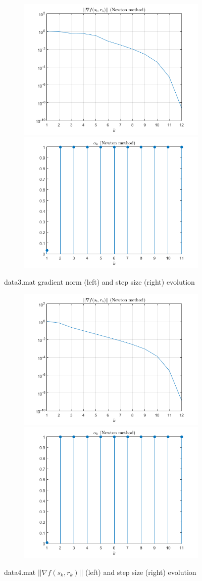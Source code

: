 \begin{figure}[H]
    \label{fig:pt2task6:data3}
    \begin{subfigure}
        \centering
        \includegraphics[width=0.45\linewidth]{part2/figures/T6_Norm_data3.png}\hspace{0em}
        \includegraphics[width=0.45\linewidth]{part2/figures/T6_stepsize_data3.png}
       
    \end{subfigure}
    \caption{data3.mat gradient norm (left) and step size (right) evolution}
\end{figure}

\begin{figure}[H]
    \label{fig:pt2task6:data4}
    \begin{subfigure}
        \centering
        \includegraphics[width=0.45\linewidth]{part2/figures/T6_Norm_data4.png}\hspace{0em}
        \includegraphics[width=0.45\linewidth]{part2/figures/T6_stepsize_data4.png}
       
    \end{subfigure}
    \caption{data4.mat $||\nabla{f(s_k,r_k)}||$ (left) and step size (right) evolution}
\end{figure}
